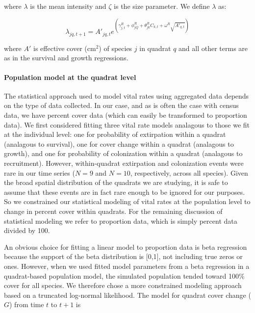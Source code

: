 \documentclass[12pt,]{article}
\begin{document}
where $\lambda$ is the mean intensity and $\zeta$ is the size parameter.
We define $\lambda$ as:

\begin{equation}
\lambda_{jq,t+1} = A'_{jq,t}e^{(\gamma^{R}_{j,t} + \phi^{R}_{jQ} + \theta^{R}_{jk}C_{k,t} + \omega^{R}\sqrt{A'_{q,t}})}
\end{equation}

where $A'$ is effective cover ($\text{cm}^2$) of species $j$ in quadrat
$q$ and all other terms are as in the survival and growth regressions.

\paragraph{Population model at the quadrat
level}\label{population-model-at-the-quadrat-level}

The statistical approach used to model vital rates using aggregated data
depends on the type of data collected. In our case, and as is often the
case with census data, we have percent cover data (which can easily be
transformed to proportion data). We first considered fitting three vital
rate models analagous to those we fit at the individual level: one for
probability of extirpation within a quadrat (analagous to survival), one
for cover change within a quadrat (analagous to growth), and one for
probability of colonization within a quadrat (analagous to recruitment).
However, within-quadrat extirpation and colonization events were rare in
our time series ($N=9$ and $N=10$, respectively, across all species).
Given the broad spatial distribution of the quadrats we are studying, it
is safe to assume that these events are in fact rare enough to be
ignored for our purposes. So we constrained our statistical modeling of
vital rates at the population level to change in percent cover within
quadrats. For the remaining discussion of statistical modeling we refer
to proportion data, which is simply percent data divided by 100.

An obvious choice for fitting a linear model to proportion data is beta
regression because the support of the beta distribution is {[}0,1{]},
not including true zeros or ones. However, when we used fitted model
parameters from a beta regression in a quadrat-based population model,
the simulated population tended toward 100\% cover for all species. We
therefore chose a more constrained modeling approach based on a
truncated log-normal likelihood. The model for quadrat cover change
($G$) from time $t$ to $t+1$ is
\end{document}

